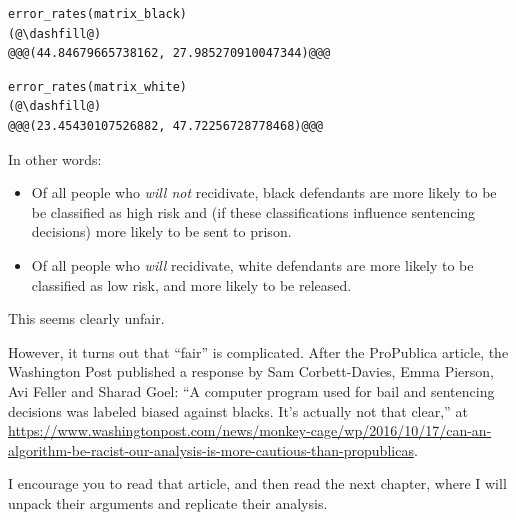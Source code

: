 \begin{lstlisting}[]
error_rates(matrix_black)
(@\dashfill@)
@@@(44.84679665738162, 27.985270910047344)@@@
\end{lstlisting}

\begin{lstlisting}[]
error_rates(matrix_white)
(@\dashfill@)
@@@(23.45430107526882, 47.72256728778468)@@@
\end{lstlisting}

In other words:

\begin{itemize}
\item
  Of all people who \emph{will not} recidivate, black defendants are
  more likely to be be classified as high risk and (if these
  classifications influence sentencing decisions) more likely to be sent
  to prison.
\item
  Of all people who \emph{will} recidivate, white defendants are more
  likely to be classified as low risk, and more likely to be released.
\end{itemize}

This seems clearly unfair.

However, it turns out that ``fair'' is complicated. After the ProPublica
article, the Washington Post published a response by Sam Corbett-Davies,
Emma Pierson, Avi Feller and Sharad Goel: ``A computer program used for
bail and sentencing decisions was labeled biased against blacks. It's
actually not that clear,'' at
\url{https://www.washingtonpost.com/news/monkey-cage/wp/2016/10/17/can-an-algorithm-be-racist-our-analysis-is-more-cautious-than-propublicas}.

I encourage you to read that article, and then read the next chapter,
where I will unpack their arguments and replicate their analysis.

